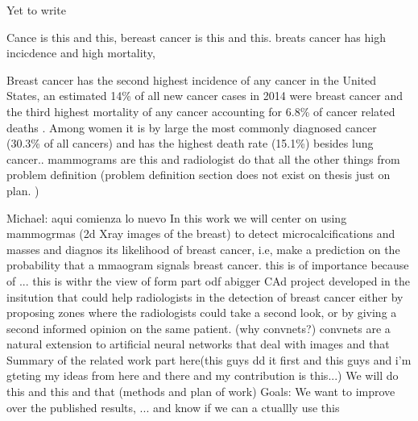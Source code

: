 Yet to write 

\begin{comment} Goes in thesis, not here because we still don't have results or discussion.
Hook(first paragarpah) : automatic breast cancer detection is a difficult taks for current automatic computationnal systems. In this article we apply deep learning techniques to digitaml mammogrpahic images and obtain better rredults than opresneted to date. 
\end{comment}
Cance is this and this, bereast cancer is this and this. breats cancer has high incicdence and high mortality,

Breast cancer has the second highest incidence of any cancer in the United States, an estimated 14\% of all new cancer cases in 2014 were breast cancer and the third highest mortality of any cancer accounting for 6.8\% of cancer related deaths \cite{http://seer.cancer.gov/statfacts/html/breast.html}. Among women it is by large the most commonly diagnosed cancer (30.3\% of all cancers) and has the highest death rate (15.1\%) besides lung cancer.\cite{http://seer.cancer.gov/csr/1975_2011/browse_csr.php?sectionSEL=1&pageSEL=sect_01_table.29.html}. 
mammograms are this and radiologist do that
all the other things from problem definition (problem definition section does not exist on thesis just on plan. )

Michael: aqui comienza lo nuevo
In this work we will center on using mammogrmas (2d Xray images of the breast) to detect microcalcifications and masses and diagnos its likelihood of breast cancer, i.e, make a prediction on the probability that a mmaogram signals breast cancer. this is of importance because of ... 
this is withr the view of form part odf abigger CAd project developed in the insitution that could help radiologists in the detection of breast cancer either by proposing zones where the radiologists could take a second look, or by giving a second informed opinion on the same patient.
(why convnets?)
convnets are a natural extension to artificial neural networks that deal with images and that
Summary of the related work part here(this guys dd it first and this guys and i'm gteting my ideas from here and there and my contribution is this...)
We will do this and this and that (methods and plan of work)
Goals: We want to improve over the published results, ... and know if we can a ctuallly use this  

